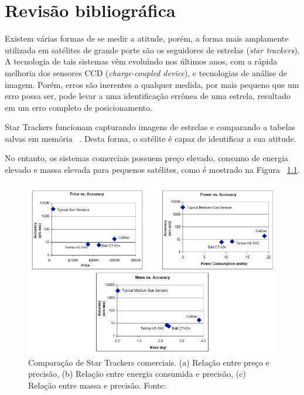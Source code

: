\chapter{Revisão bibliográfica}
\label{cap:Revisao_bibliografica_init}

Existem várias formas de se medir a atitude, porém, 
a forma mais amplamente utilizada em satélites de grande porte são os seguidores de estrelas (\textit{star trackers}). 
A tecnologia de tais sistemas vêm evoluindo nos últimos anos, com a rápida melhoria dos sensores CCD (\textit{charge-coupled device}), 
e tecnologias de análise de imagem. Porém,  erros são  inerentes a qualquer medida, por mais pequeno que um erro possa ser, pode levar a uma identificação errônea de uma estrela, resultado em um erro completo de posicionamento.

Star Trackers funcionam capturando imagens de estrelas e comparando a tabelas salvas em memória ~\cite[]{Diaz}. Desta forma, o satélite é capaz de identificar a sua atitude.

No entanto, os sistemas comerciais possuem preço elevado, consumo de energia elevado e massa elevada para pequenos satélites, como é mostrado na Figura ~\ref{fig:Comp_star_trackers_comerciais}.

\begin{figure}[!h]
	\centering
	\includegraphics[width=1\columnwidth]{images/comp_star_trackers.png}
	\caption{Comparação de Star Trackers comerciais. (a) Relação entre preço e precisão, (b) Relação entre energia consumida e precisão, (c) Relação entre massa e precisão. Fonte: ~\cite[]{Diaz}}
	\label{fig:Comp_star_trackers_comerciais}
\end{figure}
